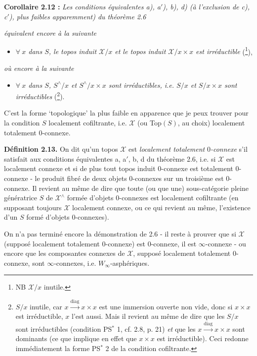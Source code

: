 \documentclass[11pt]{article}
\newcommand{\msp}[1]{\marginpar{\footnotesize [#1]}}
\newcommand{\X}{\mathscr{X}}
\begin{document}
\textbf{Corollaire 2.12 :} \textit{Les conditions équivalentes a), a$'$), b), d) (à l'exclusion de c), c$'$), plus faibles apparemment) du théorème 2.6}

\msp{page 29}\textit{équivalent encore à la suivante}
\begin{itemize}[leftmargin=2.5em]
\item[\textit{e)}] \textit{$\forall\ x$ dans $S$, le topos induit $\X/x$ et le topos induit $\X/x\times x$ est irréductible} (\footnote[37]{NB $\X/x$ inutile.}),
\end{itemize}
\textit{où encore à la suivante} %
\begin{itemize}[leftmargin=2.5em]
\item[\textit{e$'$)}] \textit{$\forall\ x$ dans $S$, $S^\wedge/x$ et $S^\wedge/x{\times}x$ sont irréductibles, i.e. $S/x$ et $S/x{\times}x$ sont irréductibles} (\footnote[38]{$S/x$ inutile, car $x\xrightarrow{\mathrm{diag}}x\times x$ est une immersion ouverte non vide, donc si $x\times x$ est irréductible, $x$ l'est aussi. Mais il revient au même de dire que les $S/x$ sont irréductibles (condition PS$^*$ 1, cf. 2.8, p. 21) \textit{et} que les $x\xrightarrow{\mathrm{diag}}x\times x$ sont dominants (ce que implique en effet que $x\times x$ est irréductible). Ceci redonne immédiatement la forme PS$^*$ 2 de la condition cofiltrante. %
}).
\end{itemize}
C'est la forme `topologique' la plus faible en apparence que je peux trouver pour la condition $S$ localement cofiltrante, i.e. $\X$ (ou Top$(S)$, au choix) localement totalement 0-connexe.

\textbf{Définition 2.13.} On dit qu'un topos $\X$ est \textit{localement totalement} $0$\textit{-connexe} s'il satisfait aux conditions équivalentes a, a$'$, b, d du théorème 2.6, i.e. si $\X$ est localement connexe et si de plus tout topos induit 0-connexe est totalement 0-connexe - le produit fibré de deux objets 0-connexes sur un troisième est 0-connexe. Il revient au même de dire que toute (ou que une) sous-catégorie pleine génératrice $S$ de $\X^\wedge$ formée d'objets 0-connexes est localement cofiltrante (en supposant toujours $\X$ localement connexe, ou ce qui revient au même, l'existence d'un $S$ formé d'objets 0-connexes).

On n'a pas terminé encore la démonstration de 2.6 - il reste à prouver que si $\X$ (supposé localement totalement 0-connexe) est 0-connexe, il est $\infty$-connexe - ou encore que les composantes connexes de $\X$, supposé localement totalement 0-connexe, sont $\infty$-connexes, i.e. $W_\infty$-asphériques.
\end{document}
